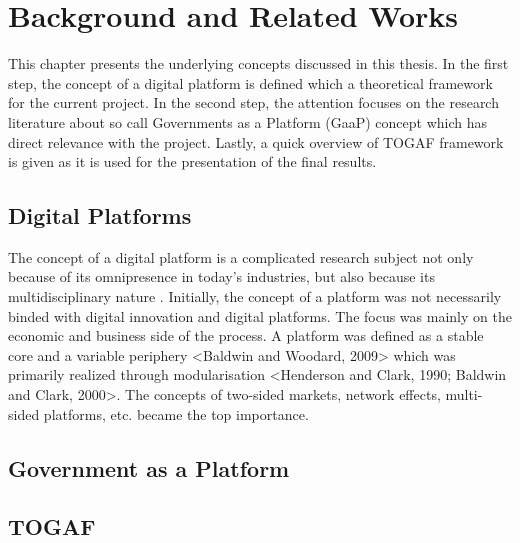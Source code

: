\setcounter{reaction}{0}%


\chapter{Background and Related Works} \label{chapter2}

This chapter presents the underlying concepts discussed in this thesis. In the first step, the concept of a digital platform is defined which a theoretical framework for the current project. In the second step, the attention focuses on the research literature about so call Governments as a Platform (GaaP) concept which has direct relevance with the project. Lastly, a quick overview of TOGAF framework is given as it is used for the presentation of the final results.

\section{Digital Platforms}
The concept of a digital platform is a complicated research subject not only because of its omnipresence in today's industries, but also because its multidisciplinary nature \citep{deReuver:2018}. Initially, the concept of a platform was not necessarily binded with digital innovation and digital platforms. The focus was mainly on the economic and business side of the process. A platform was defined as a stable core and a variable periphery <Baldwin and Woodard, 2009> which was primarily realized through modularisation <Henderson and Clark, 1990; Baldwin and Clark, 2000>. The concepts of two-sided markets, network effects, multi-sided platforms, etc. became the top importance.

\section{Government as a Platform}

\section{TOGAF}

